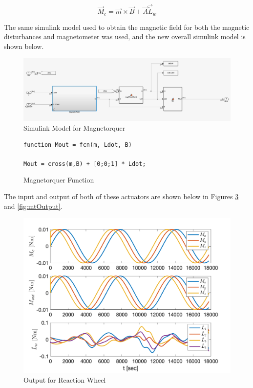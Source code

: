 \begin{equation}
    \Vec{M}_c = \Vec{m} \times \Vec{B} + \Vec{A} \Vec{\dot L}_w
\end{equation}

The same simulink model used to obtain the magnetic field for both the magnetic disturbances and magnetometer was used, and the new overall simulink model is shown below.

\begin{figure}[H]
    \centering
    \captionsetup{ justification = centering }
    \includegraphics[width = 15cm]{Images/PS9/magnetorquerModel.png}
    \caption{Simulink Model for Magnetorquer}
    \label{fig:simulink_magnetorquer}
\end{figure}

\begin{figure}[H]
    \centering
    \captionsetup{ justification = centering}
    \begin{lstlisting}
function Mout = fcn(m, Ldot, B)

Mout = cross(m,B) + [0;0;1] * Ldot;
    \end{lstlisting}
    \caption{Magnetorquer Function}
    \label{fig:mtCode}
\end{figure}

The input and output of both of these actuators are shown below in Figures \ref{fig:rwOutput} and \ref{fig:mtOutput}.

\begin{figure}[H]
    \centering
    \captionsetup{ justification = centering }
    \includegraphics[width = 15cm]{Images/PS9/reaction_wheel_model_output.png}
    \caption{Output for Reaction Wheel}
    \label{fig:rwOutput}
\end{figure}

